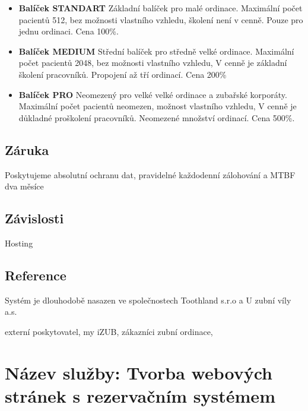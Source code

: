 \documentclass[12pt, a4paper, titlepage]{article}
\begin{document}
	\newpage

	\noindent\makebox[\linewidth]{\rule{16cm}{0.4pt}}

	\begin{itemize}

		

		\item \textbf{Balíček STANDART} Základní balíček pro malé ordinace. Maximální počet pacientů 512, bez možnosti vlastního vzhledu, školení není v cenně. Pouze pro jednu ordinaci. Cena 100\%.

		\item \textbf{Balíček MEDIUM} Střední balíček pro středně velké ordinace. Maximální počet pacientů 2048, bez možnosti vlastního vzhledu, V cenně je základní školení pracovníků. Propojení až tří ordinací. Cena 200\%

		\item \textbf{Balíček PRO} Neomezený pro velké velké ordinace a zubařské korporáty. Maximální počet pacientů neomezen, možnost vlastního vzhledu, V cenně je důkladné proškolení pracovníků. Neomezené množství ordinací. Cena 500\%.
	\end{itemize}

	\subsection*{Záruka}

	Poskytujeme absolutní ochranu dat, pravidelné každodenní zálohování a MTBF dva měsíce

	\subsection*{Závislosti}

	Hosting

	\subsection*{Reference}
	Systém je dlouhodobě nasazen ve společnostech Toothland s.r.o a U zubní víly a.s.

	externí poskytovatel,
	my iZUB, zákazníci zubní ordinace,





	\section*{Název služby: Tvorba webových stránek s rezervačním systémem}
\end{document}
